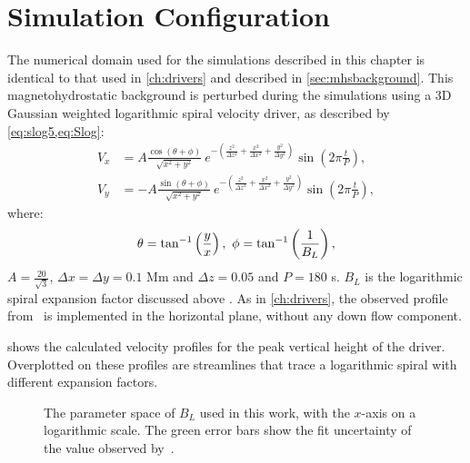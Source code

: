 \documentclass[a4paper,12pt,fourier,authoryear,custommargin]{Classes/PhDThesisPSnPDF}
\begin{document}
\section{Simulation Configuration}\label{sec:simconfig}
The numerical domain used for the simulations described in this chapter is identical to that used in \cref{ch:drivers} and described in \cref{sec:mhsbackground}.
This magnetohydrostatic background is perturbed during the simulations using a 3D Gaussian weighted logarithmic spiral velocity driver, as described by \cref{eq:slog5,eq:Slog}:
\begin{subequations}
    \begin{align}
    V_x &= A \frac{\cos(\theta + \phi)}{\sqrt{x^2 + y^2}}\ e^{-\left(\frac{z^2}{\Delta z^2} + \frac{x^2}{\Delta x^2} + \frac{y^2}{\Delta y^2}\right)} \sin \left(2\pi \frac{t}{P}\right),\\
    V_y &= - A \frac{\sin(\theta + \phi)}{\sqrt{x^2 + y^2}}\ e^{-\left(\frac{z^2}{\Delta z^2} + \frac{x^2}{\Delta x^2} + \frac{y^2}{\Delta y^2}\right)} \sin \left(2\pi \frac{t}{P}\right),
    \end{align}
    \label{eq:slog5}
\end{subequations}
where:
\begin{equation*}
\theta = \tan^{-1}\left(\frac{y}{x}\right),\ \phi = \tan^{-1}\left(\frac{1}{B_L}\right),\notag
\end{equation*}
$A=\frac{20}{\sqrt{3}}$, $\Delta x = \Delta y = 0.1$ Mm and $\Delta z = 0.05$ and $P=180$ s.
$B_L$ is the logarithmic spiral expansion factor discussed above
\citep{mumford2015}.
As in \cref{ch:drivers}, the observed profile from~\cite{bonet2008} is implemented in the horizontal plane, without any down flow component.

 shows the calculated velocity profiles for the peak vertical height of the driver.
Overplotted on these profiles are streamlines that trace a logarithmic spiral with different expansion factors.



\begin{figure}[h]
    \centering
    \caption{The parameter space of $B_L$ used in this work, with the $x$-axis on a logarithmic scale. The green error bars show the fit uncertainty of the value observed by~\citet{bonet2008}.}
    \label{fig:B-L-values}
\end{figure}
\end{document}
